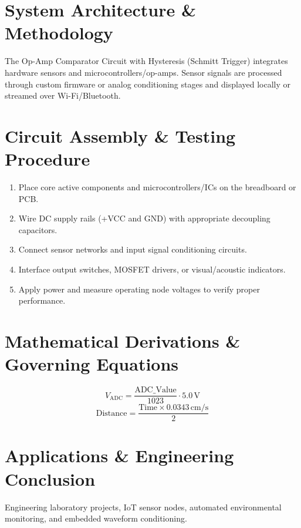 \documentclass[11pt,a4paper]{article}
\begin{document}
\section{System Architecture \& Methodology}
The Op-Amp Comparator Circuit with Hysteresis (Schmitt Trigger) integrates hardware sensors and microcontrollers/op-amps. Sensor signals are processed through custom firmware or analog conditioning stages and displayed locally or streamed over Wi-Fi/Bluetooth.

\section{Circuit Assembly \& Testing Procedure}
\begin{enumerate}
    \item Place core active components and microcontrollers/ICs on the breadboard or PCB.
    \item Wire DC supply rails (+VCC and GND) with appropriate decoupling capacitors.
    \item Connect sensor networks and input signal conditioning circuits.
    \item Interface output switches, MOSFET drivers, or visual/acoustic indicators.
    \item Apply power and measure operating node voltages to verify proper performance.
\end{enumerate}

\section{Mathematical Derivations \& Governing Equations}
\begin{equation}
V_{\text{ADC}} = \frac{\text{ADC\_Value}}{1023} \cdot 5.0\,\text{V}
\end{equation}
\begin{equation}
\text{Distance} = \frac{\text{Time} \times 0.0343\,\text{cm/s}}{2}
\end{equation}

\section{Applications \& Engineering Conclusion}
Engineering laboratory projects, IoT sensor nodes, automated environmental monitoring, and embedded waveform conditioning.
\end{document}

